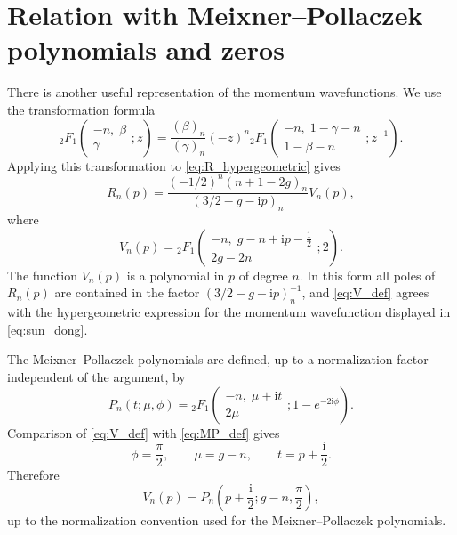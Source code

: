 \documentclass[11pt,reqno]{amsart}
\newcommand{\ii}{\mathrm{i}}
\numberwithin{equation}{section}
\begin{document}
\section{Relation with Meixner--Pollaczek polynomials and zeros}\label{sec:mp}

There is another useful representation of the momentum wavefunctions.  We use the transformation
formula
\begin{equation}
  {}_2F_1\!\left(
  \begin{matrix}
  -n,\;\beta\\
  \gamma
  \end{matrix};z
  \right)
  =\frac{(\beta)_n}{(\gamma)_n}(-z)^n
  {}_2F_1\!\left(
  \begin{matrix}
  -n,\;1-\gamma-n\\
  1-\beta-n
  \end{matrix};z^{-1}
  \right).
  \label{eq:hypergeometric_transform}
\end{equation}
Applying this transformation to \eqref{eq:R_hypergeometric} gives
\begin{equation}
  R_n(p)=
  \frac{(-1/2)^n(n+1-2g)_n}{(3/2-g-\ii p)_n}
  V_n(p),
  \label{eq:R_V_factorization}
\end{equation}
where
\begin{equation}
  V_n(p)=
  {}_2F_1\!\left(
  \begin{matrix}
  -n,\; g-n+\ii p-\frac12\\
  2g-2n
  \end{matrix};2
  \right).
  \label{eq:V_def}
\end{equation}
The function $V_n(p)$ is a polynomial in $p$ of degree $n$.  In this form all poles of
$R_n(p)$ are contained in the factor $(3/2-g-\ii p)_n^{-1}$, and \eqref{eq:V_def} agrees with the
hypergeometric expression for the momentum wavefunction displayed in \eqref{eq:sun_dong}.

The Meixner--Pollaczek polynomials are defined, up to a normalization factor independent of the
argument, by
\begin{equation}
  P_n(t;\mu,\phi)=
  {}_2F_1\!\left(
  \begin{matrix}
  -n,\;\mu+\ii t\\
  2\mu
  \end{matrix};1-e^{-2\ii\phi}
  \right).
  \label{eq:MP_def}
\end{equation}
Comparison of \eqref{eq:V_def} with \eqref{eq:MP_def} gives
\begin{equation}
  \phi=\frac{\pi}{2},
  \qquad \mu=g-n,
  \qquad t=p+\frac{\ii}{2}.
  \label{eq:MP_parameters}
\end{equation}
Therefore
\begin{equation}
  V_n(p)=P_n\!\left(p+\frac{\ii}{2};g-n,\frac{\pi}{2}\right),
  \label{eq:V_MP}
\end{equation}
up to the normalization convention used for the Meixner--Pollaczek polynomials.
\end{document}
